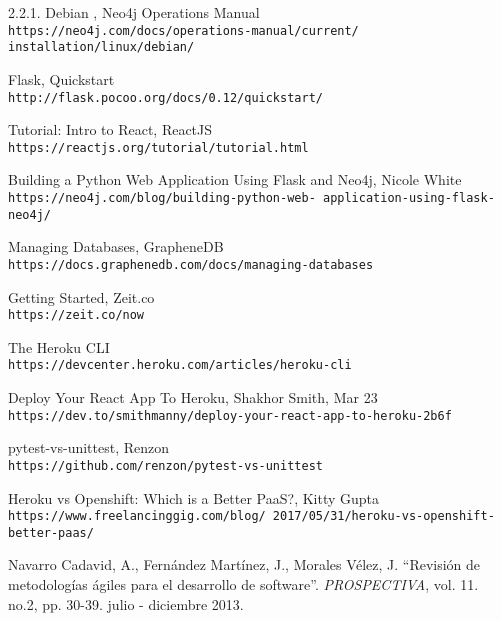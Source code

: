 \begin{thebibliography}{999}
2.2.1. Debian , Neo4j Operations Manual
\\\texttt{https://neo4j.com/docs/operations-manual/current/
installation/linux/debian/}

Flask, Quickstart
\\\texttt{http://flask.pocoo.org/docs/0.12/quickstart/}

Tutorial: Intro to React, ReactJS
\\\texttt{https://reactjs.org/tutorial/tutorial.html}

Building a Python Web Application Using Flask and Neo4j, Nicole White
\\\texttt{https://neo4j.com/blog/building-python-web-
application-using-flask-neo4j/}

Managing Databases, GrapheneDB
\\\texttt{https://docs.graphenedb.com/docs/managing-databases}

Getting Started, Zeit.co
\\\texttt{https://zeit.co/now}

The Heroku CLI
\\\texttt{https://devcenter.heroku.com/articles/heroku-cli}

Deploy Your React App To Heroku,  Shakhor Smith, Mar 23
\\\texttt{https://dev.to/smithmanny/deploy-your-react-app-to-heroku-2b6f}


pytest-vs-unittest, Renzon
\\\texttt{https://github.com/renzon/pytest-vs-unittest}


Heroku vs Openshift: Which is a Better PaaS?, Kitty Gupta
\\\texttt{https://www.freelancinggig.com/blog/
2017/05/31/heroku-vs-openshift-better-paas/}

 Navarro Cadavid, A., Fernández Martínez, J., Morales Vélez, J. ``Revisión de metodologías ágiles para el desarrollo de software''. {\it PROSPECTIVA}, vol. 11. no.2, pp. 30-39. julio - diciembre 2013.

\end{thebibliography}


